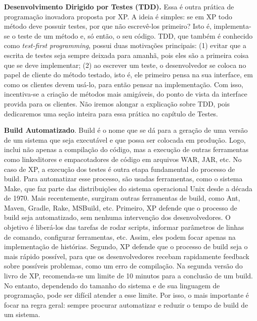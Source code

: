 \documentclass[
  11pt,
  twoside]{book}
\begin{document}
 \textbf{Desenvolvimento Dirigido por
Testes (TDD).} Essa é outra prática de programação inovadora proposta
por XP. A ideia é simples: se em XP todo método deve possuir testes, por
que não escrevê-los primeiro? Isto é, implementa-se o teste de um método
e, só então, o seu código. TDD, que também é conhecido como
\emph{test-first programming}, possui duas motivações principais: (1)
evitar que a escrita de testes seja sempre deixada para amanhã, pois
eles são a primeira coisa que se deve implementar; (2) ao escrever um
teste, o desenvolvedor se coloca no papel de cliente do método testado,
isto é, ele primeiro pensa na sua interface, em como os clientes devem
usá-lo, para então pensar na implementação. Com isso, incentiva-se a
criação de métodos mais amigáveis, do ponto de vista da interface
provida para os clientes. Não iremos alongar a explicação sobre TDD,
pois dedicaremos uma seção inteira para essa prática no capítulo de
Testes.

 \textbf{Build Automatizado}. Build é o nome
que se dá para a geração de uma versão de um sistema que seja executável
e que possa ser colocada em produção. Logo, inclui não apenas a
compilação do código, mas a execução de outras ferramentas como
linkeditores e empacotadores de código em arquivos WAR, JAR, etc. No
caso de XP, a execução dos testes é outra etapa fundamental do processo
de build. Para automatizar esse processo, são usadas ferramentas, como o
sistema Make, que faz parte das distribuições do sistema operacional
Unix desde a década de 1970. Mais recentemente, surgiram outras
ferramentas de build, como Ant, Maven, Gradle, Rake, MSBuild, etc.
Primeiro, XP defende que o processo de build seja automatizado, sem
nenhuma intervenção dos desenvolvedores. O objetivo é liberá-los das
tarefas de rodar scripts, informar parâmetros de linhas de comando,
configurar ferramentas, etc. Assim, eles podem focar apenas na
implementação de histórias. Segundo, XP defende que o processo de build
seja o mais rápido possível, para que os desenvolvedores recebam
rapidamente feedback sobre possíveis problemas, como um erro de
compilação. Na segunda versão do livro de XP, recomenda-se um limite de
10 minutos para a conclusão de um build. No entanto, dependendo do
tamanho do sistema e de sua linguagem de programação, pode ser difícil
atender a esse limite. Por isso, o mais importante é focar na regra
geral: sempre procurar automatizar e reduzir o tempo de build de um
sistema.
\end{document}
